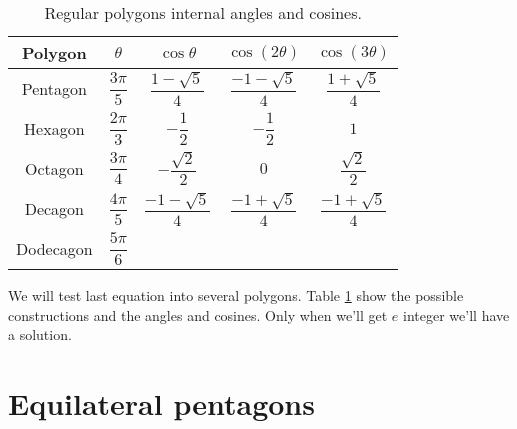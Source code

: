 \documentclass[11pt]{article}
\begin{document}
\begin{table}[h]
\centering
\begin{tabular}{|c c c c c|}\hline
Polygon & $\theta$ & $\cos\theta$ & $\cos(2\theta)$ & $\cos(3\theta)$ \rule[-2ex]{0pt}{6ex}\\ \hline\hline 
Pentagon & $\dfrac{3\pi}{5}$ & $\dfrac{1-\sqrt{5}}{4}$ & $\dfrac{-1-\sqrt{5}}{4}$ & $\dfrac{1+\sqrt{5}}{4}$\rule[-2ex]{0pt}{6ex}\\ \hline
Hexagon & $\dfrac{2\pi}{3}$ & $-\dfrac{1}{2}$ & $-\dfrac{1}{2}$ & $1$ \rule[-2ex]{0pt}{6ex}\\ \hline
Octagon & $\dfrac{3\pi}{4}$ & $-\dfrac{\sqrt{2}}{2}$ & $0$ & $\dfrac{\sqrt{2}}{2}$ \rule[-2ex]{0pt}{6ex}\\ \hline
Decagon & $\dfrac{4\pi}{5}$ & $\dfrac{-1-\sqrt{5}}{4}$ & $\dfrac{-1+\sqrt{5}}{4}$ & $\dfrac{-1+\sqrt{5}}{4}$ \rule[-2ex]{0pt}{6ex}\\ \hline
Dodecagon & $\dfrac{5\pi}{6}$ &  &  & \rule[-2ex]{0pt}{6ex}\\ \hline

\end{tabular}
\caption{Regular polygons internal angles and cosines.}
\label{tbl:polygons}
\end{table}

We will test last equation into several polygons. Table \ref{tbl:polygons}
show the possible constructions and the angles and cosines.
Only when we'll get $e$ integer we'll have a solution.

\section{Equilateral pentagons}
\end{document}
